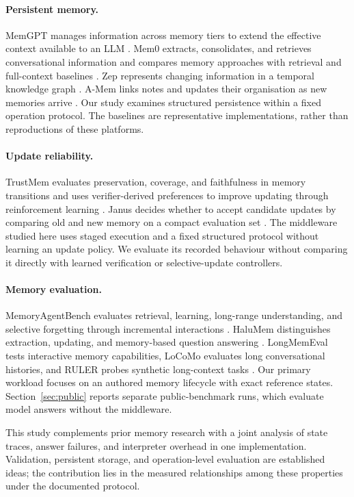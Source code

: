 \documentclass[11pt,a4paper]{article}
\begin{document}
\paragraph{Persistent memory.}
MemGPT manages information across memory tiers to extend the effective context available to an LLM \cite{memgpt}. Mem0 extracts, consolidates, and retrieves conversational information and compares memory approaches with retrieval and full-context baselines \cite{mem0}. Zep represents changing information in a temporal knowledge graph \cite{zep}. A-Mem links notes and updates their organisation as new memories arrive \cite{amem}. Our study examines structured persistence within a fixed operation protocol. The baselines are representative implementations, rather than reproductions of these platforms.

\paragraph{Update reliability.}
TrustMem evaluates preservation, coverage, and faithfulness in memory transitions and uses verifier-derived preferences to improve updating through reinforcement learning \cite{trustmem}. Janus decides whether to accept candidate updates by comparing old and new memory on a compact evaluation set \cite{janus}. The middleware studied here uses staged execution and a fixed structured protocol without learning an update policy. We evaluate its recorded behaviour without comparing it directly with learned verification or selective-update controllers.

\paragraph{Memory evaluation.}
MemoryAgentBench evaluates retrieval, learning, long-range understanding, and selective forgetting through incremental interactions \cite{memoryagentbench}. HaluMem distinguishes extraction, updating, and memory-based question answering \cite{halumem}. LongMemEval tests interactive memory capabilities, LoCoMo evaluates long conversational histories, and RULER probes synthetic long-context tasks \cite{longmemeval,locomo,ruler}. Our primary workload focuses on an authored memory lifecycle with exact reference states. Section~\ref{sec:public} reports separate public-benchmark runs, which evaluate model answers without the middleware.

This study complements prior memory research with a joint analysis of state traces, answer failures, and interpreter overhead in one implementation. Validation, persistent storage, and operation-level evaluation are established ideas; the contribution lies in the measured relationships among these properties under the documented protocol.
\end{document}
